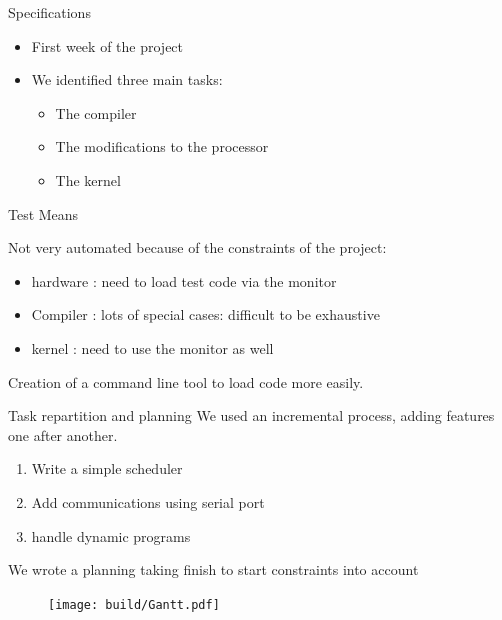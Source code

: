 \documentclass{beamer}
\begin{document}
      
      \begin{frame}{Specifications}
        \begin{itemize}
          \item First week of the project
          \item We identified three main tasks:
            \begin{itemize}
              \item The compiler
              \item The modifications to the processor
              \item The kernel
            \end{itemize}
          \end{itemize}
      \end{frame}

      \begin{frame}{Test Means} 

        Not very automated because of the constraints of the project:
        \begin{itemize}
          \item hardware : need to load test code via the monitor
          \item Compiler : lots of special cases: difficult to be exhaustive 
          \item kernel : need to use the monitor as well
        \end{itemize}
        Creation of a command line tool to load code more easily. 
      \end{frame}

      \begin{frame}{Task repartition and planning}
          We used an incremental process, adding features one after another.
          \begin{enumerate}
            \item Write a simple scheduler
            \item Add communications using serial port
            \item handle dynamic programs
          \end{enumerate}
          We wrote a planning taking finish to start constraints into account
      \end{frame}

      \begin{frame}[plain]
        \begin{figure}
          \texttt{[image: build/Gantt.pdf]}
        \end{figure}
      \end{frame}
\end{document}
